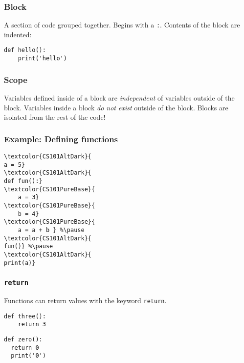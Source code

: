 \documentclass[11pt]{beamer}
\begin{document}
\begin{frame}[fragile]
  \frametitle{Block}
  \Enlarge

  \begin{itemize}
  \myitem  A section of code grouped together. %
  \myitem  Begins with a \texttt{:}. %
  \myitem  Contents of the block are indented:
  \end{itemize}
  \begin{Verbatim}[commandchars=\\\{\},commentchar=\%]
def hello():
    print('hello')
  \end{Verbatim}
\end{frame}

\begin{frame}
  \frametitle{Scope}
  \Enlarge

  \begin{itemize}
  \myitem  Variables defined inside of a block are \emph{independent} of variables outside of the block. %
  \myitem  Variables inside a block \emph{do not exist} outside of the block. %
  \myitem  Blocks are isolated from the rest of the code!
  \end{itemize}
\end{frame}

\begin{frame}[fragile]
  \frametitle{Example:  Defining functions}
  \Enlarge

  \begin{Verbatim}[commandchars=\\\{\},commentchar=\%]
\textcolor{CS101AltDark}{
a = 5}
\textcolor{CS101AltDark}{
def fun():}
\textcolor{CS101PureBase}{
    a = 3}
\textcolor{CS101PureBase}{
    b = 4}
\textcolor{CS101PureBase}{
    a = a + b } %\pause
\textcolor{CS101AltDark}{
fun()} %\pause
\textcolor{CS101AltDark}{
print(a)}
  \end{Verbatim}
\end{frame}

\begin{frame}[fragile]
  \frametitle{\texttt{return}}
  \Enlarge

  \begin{itemize}
  \myitem  Functions can return values with the keyword \texttt{return}. %
    \begin{Verbatim}[commandchars=\\\{\},commentchar=\%]
def three():
    return 3
    \end{Verbatim}
  \myitem  %
    \begin{Verbatim}[commandchars=\\\{\},commentchar=\%]
def zero():
  return 0
  print('0')
    \end{Verbatim}
  \end{itemize}
\end{frame}
\end{document}
